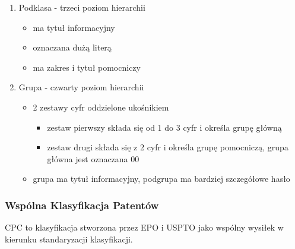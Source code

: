 \begin{enumerate}
\begin{itemize}
    \end{itemize}
    \item Podklasa - trzeci poziom hierarchii
    \begin{itemize}
        \item ma tytuł informacyjny
        \item oznaczana dużą literą
        \item ma zakres i tytuł pomocniczy
    \end{itemize}
    \item Grupa - czwarty poziom hierarchii
    \begin{itemize}
        \item 2 zestawy cyfr oddzielone ukośnikiem
        \begin{itemize}
            \item zestaw pierwszy składa się od 1 do 3 cyfr i określa grupę główną
            \item zestaw drugi składa się z 2 cyfr i określa grupę pomocniczą, grupa główna jest oznaczana 00
        \end{itemize}
        \item grupa ma tytuł informacyjny, podgrupa ma bardziej szczegółowe hasło
    \end{itemize}
\end{enumerate}



\subsubsection{Wspólna Klasyfikacja Patentów}

\ac{CPC} to klasyfikacja stworzona przez \ac{EPO} i \ac{USPTO}
jako wspólny wysiłek w kierunku standaryzacji klasyfikacji.

